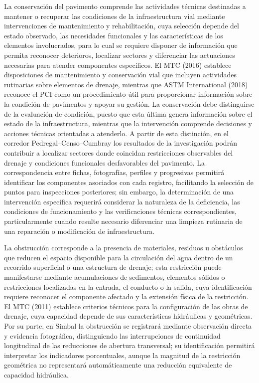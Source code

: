 
La conservación del pavimento comprende las actividades técnicas destinadas a mantener o recuperar las condiciones de la infraestructura vial mediante intervenciones de mantenimiento y rehabilitación, cuya selección depende del estado observado, las necesidades funcionales y las características de los elementos involucrados, para lo cual se requiere disponer de información que permita reconocer deterioros, localizar sectores y diferenciar las actuaciones necesarias para atender componentes específicos. El MTC (2016) establece disposiciones de mantenimiento y conservación vial que incluyen actividades rutinarias sobre elementos de drenaje, mientras que ASTM International (2018) reconoce el PCI como un procedimiento útil para proporcionar información sobre la condición de pavimentos y apoyar su gestión. La conservación debe distinguirse de la evaluación de condición, puesto que esta última genera información sobre el estado de la infraestructura, mientras que la intervención comprende decisiones y acciones técnicas orientadas a atenderlo. A partir de esta distinción, en el corredor Pedregal–Censo–Cumbray los resultados de la investigación podrán contribuir a localizar sectores donde coincidan restricciones observables del drenaje y condiciones funcionales desfavorables del pavimento. La correspondencia entre fichas, fotografías, perfiles y progresivas permitirá identificar los componentes asociados con cada registro, facilitando la selección de puntos para inspecciones posteriores; sin embargo, la determinación de una intervención específica requerirá considerar la naturaleza de la deficiencia, las condiciones de funcionamiento y las verificaciones técnicas correspondientes, particularmente cuando resulte necesario diferenciar una limpieza rutinaria de una reparación o modificación de infraestructura.


La obstrucción corresponde a la presencia de materiales, residuos u obstáculos que reducen el espacio disponible para la circulación del agua dentro de un recorrido superficial o una estructura de drenaje; esta restricción puede manifestarse mediante acumulaciones de sedimentos, elementos sólidos o restricciones localizadas en la entrada, el conducto o la salida, cuya identificación requiere reconocer el componente afectado y la extensión física de la restricción. El MTC (2011) establece criterios técnicos para la configuración de las obras de drenaje, cuya capacidad depende de sus características hidráulicas y geométricas. Por su parte, en Simbal la obstrucción se registrará mediante observación directa y evidencia fotográfica, distinguiendo las interrupciones de continuidad longitudinal de las reducciones de abertura transversal; su identificación permitirá interpretar los indicadores porcentuales, aunque la magnitud de la restricción geométrica no representará automáticamente una reducción equivalente de capacidad hidráulica.

